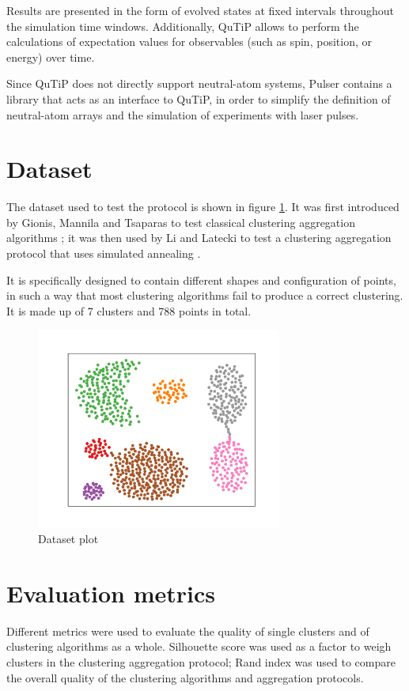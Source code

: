 Results are presented in the form of evolved states at fixed intervals throughout the simulation time windows. Additionally, QuTiP allows to perform the calculations of expectation values for observables (such as spin, position, or energy) over time.

Since QuTiP does not directly support neutral-atom systems, Pulser contains a library that acts as an interface to QuTiP, in order to simplify the definition of neutral-atom arrays and the simulation of experiments with laser pulses. 

\section{Dataset}
\label{sec:dataset}
The dataset used to test the protocol is shown in figure \ref{fig:dataset}. It was first introduced by Gionis, Mannila and Tsaparas to test classical clustering aggregation algorithms \cite{dataset}; it was then used by Li and Latecki to test a clustering aggregation protocol that uses simulated annealing \cite{aggregation}.

It is specifically designed to contain different shapes and configuration of points, in such a way that most clustering algorithms fail to produce a correct clustering. It is made up of 7 clusters and 788 points in total.

\begin{figure}[ht!]
  \centering 
  \includegraphics[width=0.72\textwidth]{figures/05experimental_setup/dataset.pdf}
  \caption{Dataset plot}
  \label{fig:dataset}
\end{figure}

\section{Evaluation metrics}
Different metrics were used to evaluate the quality of single clusters and of clustering algorithms as a whole. Silhouette score was used as a factor to weigh clusters in the clustering aggregation protocol; Rand index was used to compare the overall quality of the clustering algorithms and aggregation protocols. %

